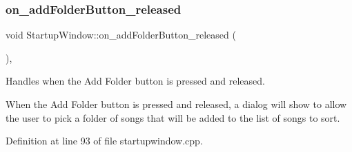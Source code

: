 \subsubsection{\texorpdfstring{on\+\_\+add\+Folder\+Button\+\_\+released}{on\_addFolderButton\_released}}
{\footnotesize\ttfamily void Startup\+Window\+::on\+\_\+add\+Folder\+Button\+\_\+released (\begin{DoxyParamCaption}{ }\end{DoxyParamCaption})\hspace{0.3cm}{\ttfamily [private]}, {\ttfamily [slot]}}



Handles when the Add Folder button is pressed and released. 

When the Add Folder button is pressed and released, a dialog will show to allow the user to pick a folder of songs that will be added to the list of songs to sort. 

Definition at line 93 of file startupwindow.\+cpp.


